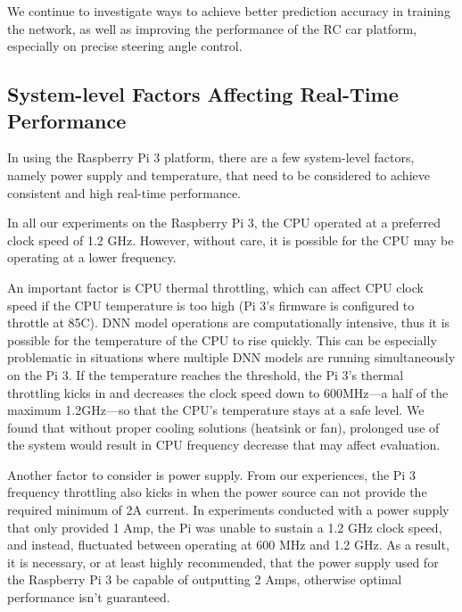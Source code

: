 We continue to investigate ways to achieve better prediction accuracy
in training the network, as well as improving the performance of the RC
car platform, especially on precise steering angle control.



\subsection{System-level Factors Affecting Real-Time Performance}
In using the Raspberry Pi 3 platform, there are a
few system-level factors, namely power supply and temperature, that
need to be considered to achieve consistent and high real-time
performance. 

In all our experiments on the Raspberry Pi 3, the CPU  operated at a
preferred clock speed of 1.2 GHz. However, without care, it is
possible for the CPU may be operating at a lower frequency. 

An important factor is CPU thermal throttling, which can affect CPU
clock speed if the CPU temperature is too high (Pi 3's firmware is
configured to throttle at 85C).
DNN model operations are computationally intensive, thus it is
possible for the temperature of the CPU to rise quickly. This can be
especially problematic in situations where multiple DNN models are
running simultaneously on the Pi 3.
If the temperature reaches the threshold, the Pi 3's thermal
throttling kicks in and decreases the clock speed down to 600MHz---a
half of the maximum 1.2GHz---so that the CPU's temperature stays at a
safe level.
We found that without proper cooling solutions (heatsink or fan), 
prolonged use of the system would result in CPU frequency decrease
that may affect evaluation.

Another factor to consider is power supply. From our experiences, the
Pi 3 frequency throttling also kicks in when the power source can not
provide the required minimum of 2A current.
In experiments conducted with a power supply that only provided 1 Amp,
the Pi was unable to sustain a 1.2 GHz clock speed, and instead,
fluctuated between operating at 600 MHz and 1.2 GHz. As a result, it
is necessary, or at least highly recommended, that the power supply
used for the Raspberry Pi 3 be capable of outputting 2 Amps, otherwise
optimal performance isn't guaranteed.

